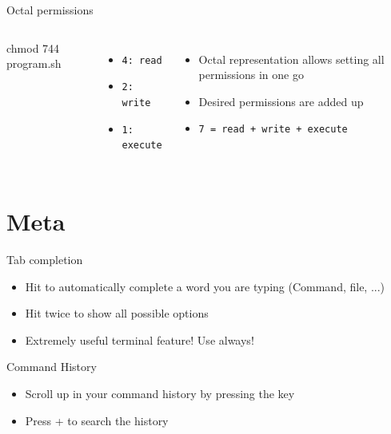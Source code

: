     \begin{frame}[t,fragile]{Octal permissions}
        \begin{columns}[T]
            \begin{bashenv}[\small]
chmod 744 program.sh
            \end{bashenv}
            \begin{itemize}
                \item \texttt{4: read}
                \item \texttt{2: write}
                \item \texttt{1: execute}
            \end{itemize}
            \begin{itemize}
                \item Octal representation allows setting all permissions in one go
                \item Desired permissions are added up
                \item \texttt{7 = read + write + execute}
            \end{itemize}
        \end{columns}
    \end{frame}

    \section{Meta}

    \begin{frame}[t,fragile]{Tab completion}
        \begin{itemize}
            \item Hit \keys{\tab} to automatically complete a word you are typing
                (Command, file, ...)
            \item Hit \keys{\tab} twice to show all possible options
            \item Extremely useful terminal feature! Use always!
        \end{itemize}
    \end{frame}

    \begin{frame}[t,fragile]{Command History}
        \begin{itemize}
            \item Scroll up in your command history by pressing the
                \keys{\arrowkeyup} key
            \item Press \keys{\ctrl} +  to search the history
        \end{itemize}
    \end{frame}

